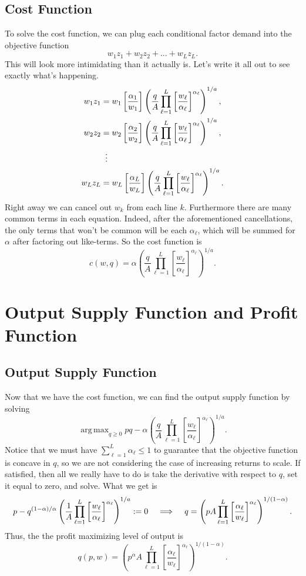 \documentclass[12pt]{article}
\newcommand{\Lindent}{\hspace{.4cm} \Longrightarrow \hspace{.4cm}}
\DeclareMathOperator*{\argmax}{arg\,max}
\theoremstyle{definition}
\begin{document}
\subsection{Cost Function}
To solve the cost function, we can plug each conditional factor demand into the objective function
	\[	w_1z_1 + w_2 z_2 + ... + w_Lz_L.\]
This will look more intimidating than it actually is. Let's write it all out to see exactly what's happening.
\begin{align*}
		w_1z_1 &=w_1 \left[ \frac{\alpha_1}{w_1} \right]  \left( \frac{q}{A} \prod_{{\ell}=1}^L \left[\frac{w_{\ell}}{\alpha_{\ell}} \right ] ^{\alpha_{\ell}} \right)^{1 / a}, \\
		w_2z_2 &=w_2 \left[ \frac{\alpha_2}{w_2} \right]  \left( \frac{q}{A} \prod_{{\ell}=1}^L \left[\frac{w_{\ell}}{\alpha_{\ell}} \right ] ^{\alpha_{\ell}} \right)^{1 / a},\\
			&\mathrel{\makebox[\widthof{=}]{\vdots}} \\
		w_Lz_L &=w_L \left[ \frac{\alpha_L}{w_L} \right] \left( \frac{q}{A} \prod_{{\ell}=1}^L \left[\frac{w_{\ell}}{\alpha_{\ell}} \right ] ^{\alpha_{\ell}} \right)^{1 / a}.
\end{align*}
Right away we can cancel out $w_{k}$ from each line $k$. Furthermore there are many common terms in each equation. Indeed, after the aforementioned cancellations, the only terms that won't be common will be each $\alpha_{\ell}$, which will be summed for $\alpha$ after factoring out like-terms. So the cost function is
	\[c(w,q) = \alpha \left( \frac{q}{A} \prod_{{\ell}=1}^L \left[\frac{w_{\ell}}{\alpha_{\ell}} \right ] ^{\alpha_{\ell}} \right)^{1 / a}.	\]
	
	
	

\section{Output Supply Function and Profit Function}


\subsection{Output Supply Function}

Now that we have the cost function, we can find the output supply function by solving
	\[	\argmax_{q \geq 0} pq	 -  \alpha \left( \frac{q}{A} \prod_{{\ell}=1}^L \left[\frac{w_{\ell}}{\alpha_{\ell}} \right ] ^{\alpha_{\ell}} \right)^{1 / a}.	\]
Notice that we must have $\sum_{{\ell}=1}^L \alpha_{\ell} \leq 1$ to guarantee that the objective function is concave in $q$, so we are not considering the case of increasing returns to scale. If satisfied, then all we really have to do is take the derivative with respect to $q$, set it equal to zero, and solve. What we get is 
\[
	p  -   q^{(1 - \alpha )/ \alpha } \left( \frac{1}{A} \prod_{{\ell}=1}^L \left[\frac{w_{\ell}}{\alpha_{\ell}} \right ] ^{\alpha_{\ell}} \right)^{1 / a}:=0  \Lindent   q = \left ( p A \prod_{{\ell}=1}^L \left[\frac{\alpha_{\ell}}{w_{\ell}} \right ] ^{\alpha_{\ell}}  \right)^{1 / (1 - \alpha)}.
\]
Thus, the the profit maximizing level of output is
	\[	q(p,w) =   \left ( p^{\alpha} A \prod_{{\ell}=1}^L \left[\frac{\alpha_{\ell}}{w_{\ell}} \right ] ^{\alpha_{\ell}}  \right)^{1 / (1 - \alpha)}.\]
\end{document}
